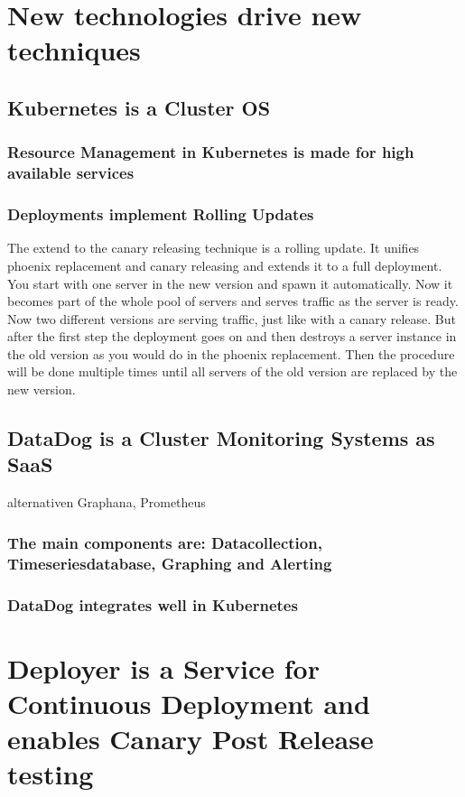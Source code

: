 \section{New technologies drive new techniques}
\subsection{Kubernetes is a Cluster OS}
\subsubsection{Resource Management in Kubernetes is made for high available services}
\subsubsection{Deployments implement Rolling Updates}

The extend to the canary releasing technique is a rolling update. It unifies phoenix replacement and canary releasing and extends it to a full deployment. You start with one server in the new version and spawn it automatically. Now it becomes part of the whole pool of servers and serves traffic as the server is ready. Now two different versions are serving traffic, just like with a canary release. But after the first step the deployment goes on and then destroys a server instance in the old version as you would do in the phoenix replacement. Then the procedure will be done multiple times until all servers of the old version are replaced by the new version.

\subsection{DataDog is a Cluster Monitoring Systems as SaaS}
alternativen Graphana, Prometheus
\subsubsection{The main components are: Datacollection, Timeseriesdatabase, Graphing and Alerting}
\subsubsection{DataDog integrates well in Kubernetes}
\section{Deployer is a Service for Continuous Deployment and enables Canary Post Release testing}
